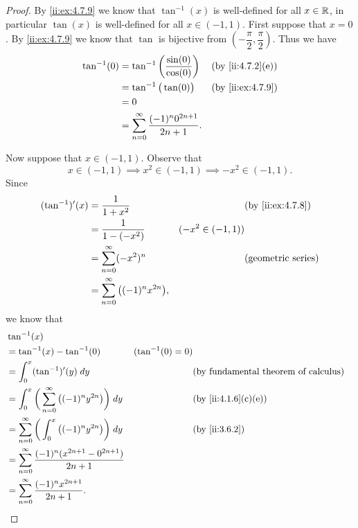\begin{proof}
  By \cref{ii:ex:4.7.9} we know that \(\tan^{-1}(x)\) is well-defined for all \(x \in \mathbb{R}\), in particular \(\tan(x)\) is well-defined for all \(x \in (-1, 1)\).
  First suppose that \(x = 0\).
  By \cref{ii:ex:4.7.9} we know that \(\tan\) is bijective from \((-\dfrac{\pi}{2}, \dfrac{\pi}{2})\).
  Thus we have
  \begin{align*}
    \tan^{-1}(0) & = \tan^{-1}\bigg(\dfrac{\sin(0)}{\cos(0)}\bigg)          &  & \by{ii:4.7.2}[e] \\
                 & = \tan^{-1}\big(\tan(0)\big)                             &  & \by{ii:ex:4.7.9} \\
                 & = 0                                                                            \\
                 & = \sum_{n = 0}^\infty \dfrac{(-1)^n 0^{2n + 1}}{2n + 1}.
  \end{align*}

  Now suppose that \(x \in (-1, 1)\).
  Observe that
  \[
    x \in (-1, 1) \implies x^2 \in (-1, 1) \implies -x^2 \in (-1, 1).
  \]
  Since
  \begin{align*}
    (\tan^{-1})'(x) & = \dfrac{1}{1 + x^2}                           &                    & \by{ii:ex:4.7.8}          \\
                    & = \dfrac{1}{1 - (-x^2)}                        & (-x^2 \in (-1, 1))                             \\
                    & = \sum_{n = 0}^\infty (-x^2)^n                 &                    & \text{(geometric series)} \\
                    & = \sum_{n = 0}^\infty \big((-1)^n x^{2n}\big),
  \end{align*}
  we know that
  \begin{align*}
     & \tan^{-1}(x)                                                                                                                                  \\
     & = \tan^{-1}(x) - \tan^{-1}(0)                                              & (\tan^{-1}(0) = 0)                                               \\
     & = \int_0^x (\tan^{-1})'(y) \; dy                                           &                    & \text{(by fundamental theorem of calculus)} \\
     & = \int_{0}^x \bigg(\sum_{n = 0}^\infty \big((-1)^n y^{2n}\big)\bigg) \; dy &                    & \by{ii:4.1.6}[c,e]                          \\
     & = \sum_{n = 0}^\infty \bigg(\int_{0}^x \big((-1)^n y^{2n}\big)\bigg) \; dy &                    & \by{ii:3.6.2}                               \\
     & = \sum_{n = 0}^\infty \dfrac{(-1)^n (x^{2n + 1} - 0^{2n + 1})}{2n + 1}                                                                        \\
     & = \sum_{n = 0}^\infty \dfrac{(-1)^n x^{2n + 1}}{2n + 1}.
  \end{align*}


\end{proof}
